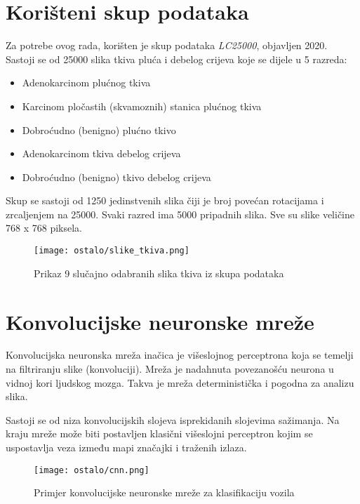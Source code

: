 \documentclass[conference, utf8]{IEEEtran}
\begin{document}
	\section{Korišteni skup podataka}
	Za potrebe ovog rada, korišten je skup podataka \textit{LC25000}, objavljen 2020. \cite{borkowski2019lung} Sastoji se od 25000 slika tkiva pluća i debelog crijeva koje se dijele u 5 razreda:
	\begin{itemize}
		\item Adenokarcinom plućnog tkiva
		\item Karcinom pločastih (skvamoznih) stanica plućnog tkiva
		\item Dobroćudno (benigno) plućno tkivo
		\item Adenokarcinom tkiva debelog crijeva
		\item Dobroćudno (benigno) tkivo debelog crijeva
	\end{itemize}
	
	Skup se sastoji od 1250 jedinstvenih slika čiji je broj povećan rotacijama i zrcaljenjem na 25000. Svaki razred ima 5000 pripadnih slika. Sve su slike veličine 768 x 768 piksela. 
	
	\begin{figure}[H]
		\centering
		\texttt{[image: ostalo/slike\_tkiva.png]}
		\caption{Prikaz 9 slučajno odabranih slika tkiva iz skupa podataka}
		\label{fig:tissue_images}
	\end{figure}
	
	\section{Konvolucijske neuronske mreže}
	Konvolucijska neuronska mreža inačica je višeslojnog perceptrona koja se temelji na filtriranju slike (konvoluciji). Mreža je nadahnuta povezanošću neurona u vidnoj kori ljudskog mozga. Takva je mreža deterministička i pogodna za analizu slika. 
	
	Sastoji se od niza konvolucijskih slojeva isprekidanih slojevima sažimanja. Na kraju mreže može biti postavljen klasični višeslojni perceptron kojim se uspostavlja veza između mapi značajki i traženih izlaza. 
	
	\begin{figure}[H]
		\centering
		\texttt{[image: ostalo/cnn.png]}
		\caption{Primjer konvolucijske neuronske mreže za klasifikaciju vozila\cite{Saha_2023}}
		\label{fig:cnn}
	\end{figure}
	
\end{document}

